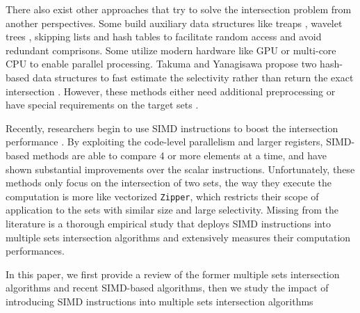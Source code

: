 \documentclass[runningheads,a4paper]{llncs}
\begin{document}
There also exist other approaches that try to solve the intersection problem from another perspectives.
Some build auxiliary data structures like treaps \cite{Blelloch1998Fast,chen2016efficient}, wavelet trees \cite{navarro2010dual}, skipping lists \cite{Culpepper2007Compact,Moffat1996Self} and hash tables \cite{Arroyuelo2010Compressed,Sanders2007Intersection,Ding2011Fast} to facilitate random access and avoid redundant comprisons.
Some utilize modern hardware like GPU \cite{Ao2011Efficient,Wu2009A,Wu2010Efficient} or multi-core CPU \cite{Tatikonda2009On,tsirogiannis2009improving} to enable parallel processing.
Takuma and Yanagisawa propose two hash-based data structures to fast estimate the selectivity rather than return the exact intersection \cite{Takuma2013Faster}.
However, these methods either need additional preprocessing or have special requirements on the target sets \cite{Inoue2014Faster}.

Recently, researchers begin to use SIMD instructions to boost the intersection performance \cite{Inoue2014Faster,Schlegel2011Fast,lemire2016simd}.
By exploiting the code-level parallelism and larger registers, SIMD-based methods are able to compare 4 or more elements at a time, and have shown substantial improvements over the scalar instructions.
Unfortunately, these methods only focus on the intersection of two sets, the way they execute the computation is more like vectorized \texttt{Zipper}, which restricts their scope of application to the sets with similar size and large selectivity.
Missing from the literature is a thorough empirical study that deploys SIMD instructions into multiple sets intersection algorithms and extensively measures their computation performances.

In this paper, we first provide a review of the former multiple sets intersection algorithms and recent SIMD-based algorithms, then we study the impact of introducing SIMD instructions into multiple sets intersection algorithms
 
\end{document}
